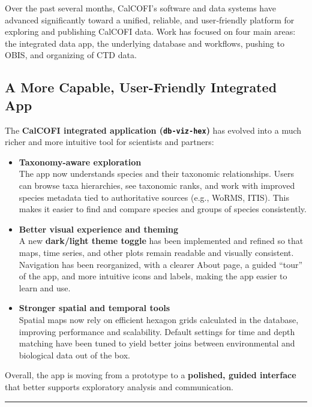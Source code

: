 \documentclass[
  letterpaper,
  DIV=11,
  numbers=noendperiod]{scrreprt}
\begin{document}
Over the past several months, CalCOFI's software and data systems have
advanced significantly toward a unified, reliable, and user‑friendly
platform for exploring and publishing CalCOFI data. Work has focused on
four main areas: the integrated data app, the underlying database and
workflows, pushing to OBIS, and organizing of CTD data.

\subsection{A More Capable, User-Friendly Integrated
App}\label{a-more-capable-user-friendly-integrated-app}

The \textbf{CalCOFI integrated application (\texttt{db-viz-hex})} has
evolved into a much richer and more intuitive tool for scientists and
partners:

\begin{itemize}
\item
  \textbf{Taxonomy-aware exploration}\\
  The app now understands species and their taxonomic relationships.
  Users can browse taxa hierarchies, see taxonomic ranks, and work with
  improved species metadata tied to authoritative sources (e.g., WoRMS,
  ITIS). This makes it easier to find and compare species and groups of
  species consistently.
\item
  \textbf{Better visual experience and theming}\\
  A new \textbf{dark/light theme toggle} has been implemented and
  refined so that maps, time series, and other plots remain readable and
  visually consistent. Navigation has been reorganized, with a clearer
  About page, a guided ``tour'' of the app, and more intuitive icons and
  labels, making the app easier to learn and use.
\item
  \textbf{Stronger spatial and temporal tools}\\
  Spatial maps now rely on efficient hexagon grids calculated in the
  database, improving performance and scalability. Default settings for
  time and depth matching have been tuned to yield better joins between
  environmental and biological data out of the box.
\end{itemize}

Overall, the app is moving from a prototype to a \textbf{polished,
guided interface} that better supports exploratory analysis and
communication.

\begin{center}\rule{0.5\linewidth}{0.5pt}\end{center}
\end{document}

